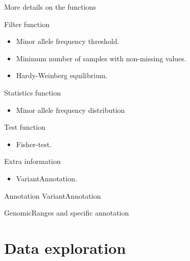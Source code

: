 \documentclass[10pt]{beamer}
\begin{document}
\begin{frame}[label=justForUs]{More details on the functions}
  \begin{block}{Filter function}
    \begin{itemize}
    \item Minor allele frequency threshold.
    \item Minimum number of samples with non-missing values.
    \item Hardy-Weinberg equilibrium.
    \end{itemize}
  \end{block}
  \begin{block}{Statistics function}
    \begin{itemize}
    \item Minor allele frequency distribution
    \end{itemize}
  \end{block}
  \begin{block}{Test function}
    \begin{itemize}
    \item Fisher-test.
    \end{itemize}
  \end{block}
  \begin{block}{Extra information}
    \begin{itemize}
    \item VariantAnnotation.
    \end{itemize}
  \end{block}
\end{frame}

\begin{frame}{Annotation}
  VariantAnnotation
\end{frame}

\begin{frame}{GenomicRanges and specific annotation}
  
\end{frame}


\section{Data exploration}
\end{document}
